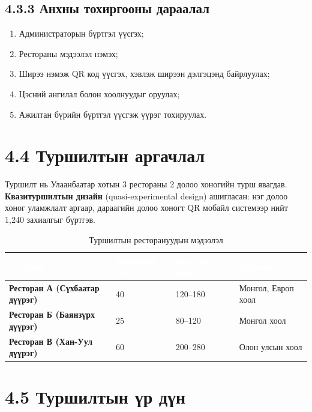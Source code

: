 \subsection{4.3.3 Анхны тохиргооны дараалал}

\begin{enumerate}
    \item Администраторын бүртгэл үүсгэх;
    \item Рестораны мэдээлэл нэмэх;
    \item Ширээ нэмэж QR код үүсгэх, хэвлэж ширээн дэлгэцэнд байрлуулах;
    \item Цэсний ангилал болон хоолнуудыг оруулах;
    \item Ажилтан бүрийн бүртгэл үүсгэж үүрэг тохируулах.
\end{enumerate}

\section{4.4 Туршилтын аргачлал}

Туршилт нь Улаанбаатар хотын 3 рестораны 2 долоо хоногийн турш явагдав.
\textbf{Квазитуршилтын дизайн} (quasi-experimental design) ашигласан:
нэг долоо хоног уламжлалт аргаар, дараагийн долоо хоногт QR мобайл системээр
нийт 1,240 захиалгыг бүртгэв.

\begin{table}[htbp]
\caption{Туршилтын ресторануудын мэдээлэл}
\label{tab:restaurants}
\centering
\begin{tabularx}{\textwidth}{|>{\bfseries}X|Z|Z|X|}
\hline
{}\textcolor{white}{\textbf{Ресторан}}
  & \textcolor{white}{\textbf{Ширээний тоо}}
  & \textcolor{white}{\textbf{Хэрэглэгч/өдөр}}
  & \textcolor{white}{\textbf{Мэргэшил}} \\ \hline
Ресторан А (Сүхбаатар дүүрэг) & 40 & 120--180 & Монгол, Европ хоол \\ \hline
Ресторан Б (Баянзүрх дүүрэг)  & 25 & 80--120  & Монгол хоол \\ \hline
Ресторан В (Хан-Уул дүүрэг)   & 60 & 200--280 & Олон улсын хоол \\ \hline
\end{tabularx}
\end{table}

\section{4.5 Туршилтын үр дүн}

